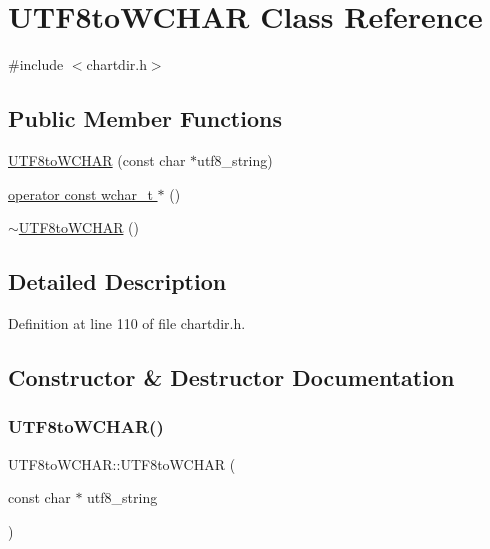 \hypertarget{class_u_t_f8to_w_c_h_a_r}{}\section{U\+T\+F8to\+W\+C\+H\+AR Class Reference}
\label{class_u_t_f8to_w_c_h_a_r}


{\ttfamily \#include $<$chartdir.\+h$>$}

\subsection*{Public Member Functions}
\begin{DoxyCompactItemize}
\item 
\hyperlink{class_u_t_f8to_w_c_h_a_r_a912971c7406d79739ccc0d46a1f6c27f}{U\+T\+F8to\+W\+C\+H\+AR} (const char $\ast$utf8\+\_\+string)
\item 
\hyperlink{class_u_t_f8to_w_c_h_a_r_a86cb80aac913631448116464a704718a}{operator const wchar\+\_\+t $\ast$} ()
\item 
\hyperlink{class_u_t_f8to_w_c_h_a_r_a49a1f399ddfb0eb2af1de3af6869ba38}{$\sim$\+U\+T\+F8to\+W\+C\+H\+AR} ()
\end{DoxyCompactItemize}


\subsection{Detailed Description}


Definition at line 110 of file chartdir.\+h.



\subsection{Constructor \& Destructor Documentation}
\mbox{\label{class_u_t_f8to_w_c_h_a_r_a912971c7406d79739ccc0d46a1f6c27f}} 
\subsubsection{\texorpdfstring{U\+T\+F8to\+W\+C\+H\+A\+R()}{UTF8toWCHAR()}}
{\footnotesize\ttfamily U\+T\+F8to\+W\+C\+H\+A\+R\+::\+U\+T\+F8to\+W\+C\+H\+AR (\begin{DoxyParamCaption}\item[{const char $\ast$}]{utf8\+\_\+string }\end{DoxyParamCaption})\hspace{0.3cm}{\ttfamily [inline]}}



